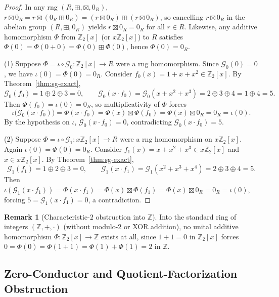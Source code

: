 \documentclass[11pt,a4paper]{article}
\theoremstyle{definition}
\newtheorem{remark}[theorem]{Remark}
\newcommand{\Z}{\mathbb{Z}}
\newcommand{\SG}{\mathcal{G}}
\begin{document}
\begin{proof}
In any rng $(R,\boxplus,\boxtimes,0_R)$, $r \boxtimes 0_R = r \boxtimes (0_R \boxplus 0_R)
= (r \boxtimes 0_R) \boxplus (r \boxtimes 0_R)$, so cancelling $r \boxtimes 0_R$ in the
abelian group $(R,\boxplus,0_R)$ yields $r \boxtimes 0_R = 0_R$ for all $r \in R$. Likewise,
any additive homomorphism $\Phi$ from $\Z_2[x]$ (or $x\Z_2[x]$) to $R$ satisfies
$\Phi(0) = \Phi(0 + 0) = \Phi(0) \boxplus \Phi(0)$, hence $\Phi(0) = 0_R$.

\smallskip
\noindent(1) Suppose $\Phi = \iota \circ \SG_0 : \Z_2[x] \to R$ were a rng homomorphism.
Since $\SG_0(0) = 0$, we have $\iota(0) = \Phi(0) = 0_R$. Consider
$f_0(x) = 1 + x + x^2 \in \Z_2[x]$. By Theorem~\ref{thm:sg-exact},
\[
  \SG_0(f_0) = 1 \oplus 2 \oplus 3 = 0, \qquad
  \SG_0(x \cdot f_0) = \SG_0(x + x^2 + x^3) = 2 \oplus 3 \oplus 4 = 1 \oplus 4 = 5.
\]
Then $\Phi(f_0) = \iota(0) = 0_R$, so multiplicativity of $\Phi$ forces
\[
  \iota\bigl(\SG_0(x \cdot f_0)\bigr) = \Phi(x \cdot f_0) = \Phi(x) \boxtimes \Phi(f_0)
  = \Phi(x) \boxtimes 0_R = 0_R = \iota(0).
\]
By the hypothesis on $\iota$, $\SG_0(x \cdot f_0) = 0$, contradicting $\SG_0(x \cdot f_0) = 5$.

\smallskip
\noindent(2) Suppose $\Phi = \iota \circ \SG_1 : x\Z_2[x] \to R$ were a rng homomorphism on
$x\Z_2[x]$. Again $\iota(0) = \Phi(0) = 0_R$. Consider
$f_1(x) = x + x^2 + x^3 \in x\Z_2[x]$ and $x \in x\Z_2[x]$. By Theorem~\ref{thm:sg-exact},
\[
  \SG_1(f_1) = 1 \oplus 2 \oplus 3 = 0, \qquad
  \SG_1(x \cdot f_1) = \SG_1(x^2 + x^3 + x^4) = 2 \oplus 3 \oplus 4 = 5.
\]
Then $\iota(\SG_1(x \cdot f_1)) = \Phi(x \cdot f_1) = \Phi(x) \boxtimes \Phi(f_1)
= \Phi(x) \boxtimes 0_R = 0_R = \iota(0)$, forcing $5 = \SG_1(x \cdot f_1) = 0$, a
contradiction.
\end{proof}

\begin{remark}[Characteristic-$2$ obstruction into $\Z$]
Into the standard ring of integers $(\Z,+,\cdot)$ (without modulo-$2$ or XOR addition), no
unital additive homomorphism $\Phi : \Z_2[x] \to \Z$ exists at all, since $1 + 1 = 0$ in
$\Z_2[x]$ forces $0 = \Phi(0) = \Phi(1+1) = \Phi(1) + \Phi(1) = 2$ in $\Z$.
\end{remark}

\subsection{Zero-Conductor and Quotient-Factorization Obstruction}
\end{document}
